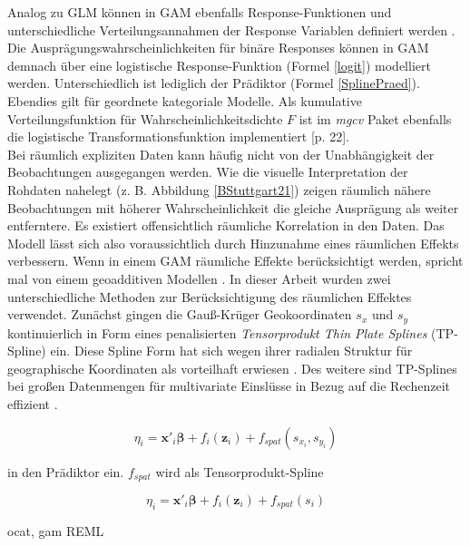 \documentclass{Vorlage}
\begin{document}
Analog zu GLM können in GAM ebenfalls Response-Funktionen und unterschiedliche Verteilungsannahmen der Response Variablen definiert werden \cite[p. 448]{fahrmeir2013regression}. Die Ausprägungswahrscheinlichkeiten für binäre Responses können in GAM demnach über eine logistische Response-Funktion (Formel \ref{logit}) modelliert werden. Unterschiedlich ist lediglich der Prädiktor (Formel \ref{SplinePraed}). Ebendies gilt für geordnete kategoriale Modelle. Als kumulative Verteilungsfunktion für Wahrscheinlichkeitsdichte $F$ ist im \textit{mgcv} Paket ebenfalls die logistische Transformationsfunktion implementiert \cite{wood2016}[p. 22].\\

Bei räumlich expliziten Daten kann häufig nicht von der Unabhängigkeit der Beobachtungen ausgegangen werden. Wie die visuelle Interpretation der Rohdaten nahelegt (z. B. Abbildung \ref{BStuttgart21}) zeigen räumlich nähere Beobachtungen mit höherer Wahrscheinlichkeit die gleiche Ausprägung als weiter entferntere. Es existiert offensichtlich räumliche Korrelation in den Daten. Das Modell lässt sich also voraussichtlich durch Hinzunahme eines räumlichen Effekts verbessern. Wenn in einem GAM räumliche Effekte berücksichtigt werden, spricht mal von einem geoadditiven Modellen \cite[p. 540]{fahrmeir2013regression}. In dieser Arbeit wurden zwei unterschiedliche Methoden zur Berücksichtigung des räumlichen Effektes verwendet. Zunächst gingen die Gauß-Krüger Geokoordinaten $s_x$ und $s_y$ kontinuierlich in Form eines penalisierten \textit{Tensorprodukt Thin Plate Splines} (TP-Spline) ein. Diese Spline Form hat sich wegen ihrer radialen Struktur für geographische Koordinaten als vorteilhaft erwiesen \cite[p. 354]{gu1993}. Des weitere sind TP-Splines bei großen Datenmengen für multivariate Einslüsse in Bezug auf die Rechenzeit effizient \cite[p. 95 f.]{wood2003}.

\begin{equation}
\eta_{i} =\mathbf{x}'_i \boldsymbol{\beta}+f_{i}(\mathbf{z}_{i})+f_{spat}(s_{x_i},s_{y_i})
\end{equation}

in den Prädiktor ein. $f_{spat}$ wird als Tensorprodukt-Spline


\begin{equation}
\eta_{i} =\mathbf{x}'_i \boldsymbol{\beta}+f_{i}(\mathbf{z}_{i})+f_{spat}(s_i)
\end{equation}




ocat, gam \cite{wood2016}
REML
\end{document}
